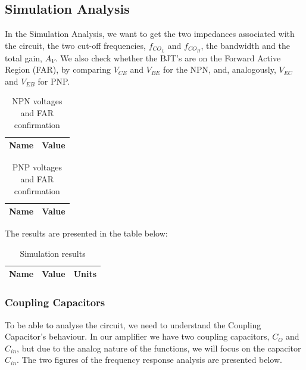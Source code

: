 \pagebreak

\subsection{Simulation Analysis}
\label{subsec:Req}

In the Simulation Analysis, we want to get the two impedances associated with the circuit, the two cut-off frequencies, $f_{CO_L}$ and $f_{CO_H}$, the bandwidth and the total gain, $A_V$.
We also check whether the BJT's are on the Forward Active Region (FAR), by comparing $V_{CE}$ and $V_{BE}$ for the NPN, and, analogously, $V_{EC}$ and $V_{EB}$ for PNP. 


\begin{table}[h]
    \centering
    \begin{tabular}{|c|c|}
    \hline
    {\bf Name} & {\bf Value} \\ \hline
    
    \end{tabular}
    \caption{NPN voltages and FAR confirmation}
    \label{tab:NPN}
\end{table}

\begin{table}[h]
    \centering
    \begin{tabular}{|c|c|}
    \hline
    {\bf Name} & {\bf Value} \\ \hline
    
    \end{tabular}
    \caption{PNP voltages and FAR confirmation}
    \label{tab:PNP}
\end{table}


The results are presented in the table below:

\begin{table}[h]
    \centering
    \begin{tabular}{|c|c|c|}
    \hline
    {\bf Name} & {\bf Value} & {\bf Units}\\ \hline
    
    \end{tabular}
    \caption{Simulation results}
    \label{tab:sim_results}
\end{table}


\subsubsection{Coupling Capacitors}

To be able to analyse the circuit, we need to understand the Coupling Capacitor's behaviour. In our amplifier we have two coupling capacitors, $C_O$ and $C_{in}$, but due to the analog nature of the functions, we will focus on the capacitor $C_{in}$.
The two figures of the frequency response analysis are presented below.

